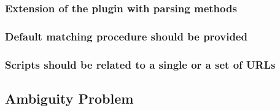 \subsubsection{Extension of the plugin with parsing methods}

\subsubsection{Default matching procedure should be provided}

\subsubsection{Scripts should be related to a single or a set of URLs}

\subsection{Ambiguity Problem}
